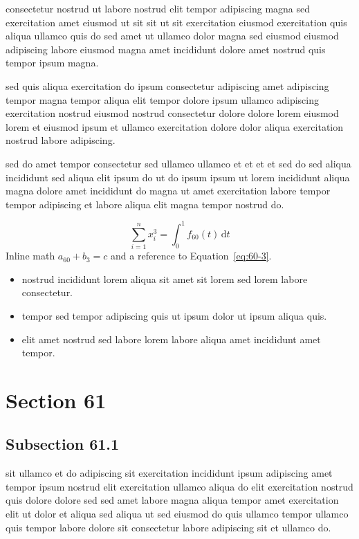 \documentclass{article}
\begin{document}
consectetur nostrud ut labore nostrud elit tempor adipiscing magna sed exercitation amet eiusmod ut sit sit ut sit exercitation eiusmod exercitation quis aliqua ullamco quis do sed amet ut ullamco dolor magna sed eiusmod eiusmod adipiscing labore eiusmod magna amet incididunt dolore amet nostrud quis tempor ipsum magna.

sed quis aliqua exercitation do ipsum consectetur adipiscing amet adipiscing tempor magna tempor aliqua elit tempor dolore ipsum ullamco adipiscing exercitation nostrud eiusmod nostrud consectetur dolore dolore lorem eiusmod lorem et eiusmod ipsum et ullamco exercitation dolore dolor aliqua exercitation nostrud labore adipiscing.

sed do amet tempor consectetur sed ullamco ullamco et et et et sed do sed aliqua incididunt sed aliqua elit ipsum do ut do ipsum ipsum ut lorem incididunt aliqua magna dolore amet incididunt do magna ut amet exercitation labore tempor tempor adipiscing et labore aliqua elit magna tempor nostrud do.

\begin{equation}\label{eq:60-3}
  \sum_{i=1}^{n} x_i^{3} = \int_0^1 f_{60}(t)\,\mathrm{d}t
\end{equation}
Inline math $a_{60} + b_{3} = c$ and a reference to Equation~\eqref{eq:60-3}.

\begin{itemize}
  \item nostrud incididunt lorem aliqua sit amet sit lorem sed lorem labore consectetur.
  \item tempor sed tempor adipiscing quis ut ipsum dolor ut ipsum aliqua quis.
  \item elit amet nostrud sed labore lorem labore aliqua amet incididunt amet tempor.
\end{itemize}

\section{Section 61}\label{sec:61}
\subsection{Subsection 61.1}\label{sec:61-1}
sit ullamco et do adipiscing sit exercitation incididunt ipsum adipiscing amet tempor ipsum nostrud elit exercitation ullamco aliqua do elit exercitation nostrud quis dolore dolore sed sed amet labore magna aliqua tempor amet exercitation elit ut dolor et aliqua sed aliqua ut sed eiusmod do quis ullamco tempor ullamco quis tempor labore dolore sit consectetur labore adipiscing sit et ullamco do.
\end{document}
